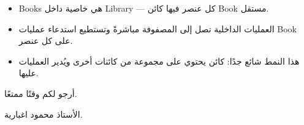\documentclass[14pt]{extarticle}
\begin{document}
\begin{itemize}[itemsep=1pt]
    \item \textenglish{Books} هي خاصية داخل \textenglish{Library} — كل عنصر فيها كائن \textenglish{Book} مستقل.
    \item العمليات الداخلية تصل إلى المصفوفة مباشرةً وتستطيع استدعاء عمليات \textenglish{Book} على كل عنصر.
    \item هذا النمط شائع جدًا: كائن يحتوي على مجموعة من كائنات أخرى ويُدير العمليات عليها.
\end{itemize}

\vspace{1em}
\begin{flushleft}
أرجو لكم وقتًا ممتعًا.

الأستاذ محمود اغبارية.
\end{flushleft}
\end{document}

